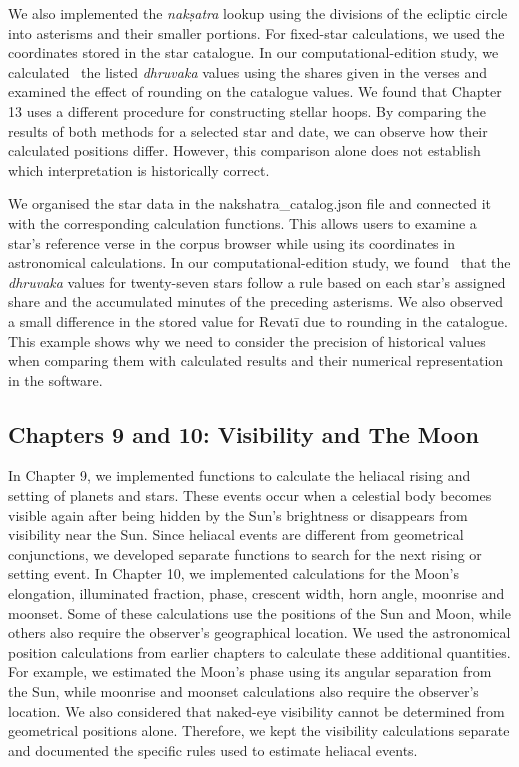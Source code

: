\documentclass[12pt,a4paper,oneside]{report}
\begin{document}
We also implemented the \emph{nakṣatra} lookup using the divisions of the ecliptic circle into asterisms and their smaller portions. For fixed-star calculations, we used the coordinates stored in the star catalogue. In our computational-edition study, we calculated~\cite{nigam2026edition} the listed \emph{dhruvaka} values using the shares given in the verses and examined the effect of rounding on the catalogue values. We found that Chapter 13 uses a different procedure for constructing stellar hoops. By comparing the results of both methods for a selected star and date, we can observe how their calculated positions differ. However, this comparison alone does not establish which interpretation is historically correct.

We organised the star data in the nakshatra\_catalog.json file and connected it with the corresponding calculation functions. This allows users to examine a star's reference verse in the corpus browser while using its coordinates in astronomical calculations. In our computational-edition study, we found~\cite{nigam2026edition} that the \emph{dhruvaka} values for twenty-seven stars follow a rule based on each star's assigned share and the accumulated minutes of the preceding asterisms. We also observed a small difference in the stored value for Revatī due to rounding in the catalogue. This example shows why we need to consider the precision of historical values when comparing them with calculated results and their numerical representation in the software.

\subsection{Chapters 9 and 10: Visibility and The Moon}

In Chapter 9, we implemented functions to calculate the heliacal rising and setting of planets and stars. These events occur when a celestial body becomes visible again after being hidden by the Sun's brightness or disappears from visibility near the Sun. Since heliacal events are different from geometrical conjunctions, we developed separate functions to search for the next rising or setting event. In Chapter 10, we implemented calculations for the Moon's elongation, illuminated fraction, phase, crescent width, horn angle, moonrise and moonset. Some of these calculations use the positions of the Sun and Moon, while others also require the observer's geographical location. We used the astronomical position calculations from earlier chapters to calculate these additional quantities. For example, we estimated the Moon's phase using its angular separation from the Sun, while moonrise and moonset calculations also require the observer's location. We also considered that naked-eye visibility cannot be determined from geometrical positions alone. Therefore, we kept the visibility calculations separate and documented the specific rules used to estimate heliacal events.
\end{document}
